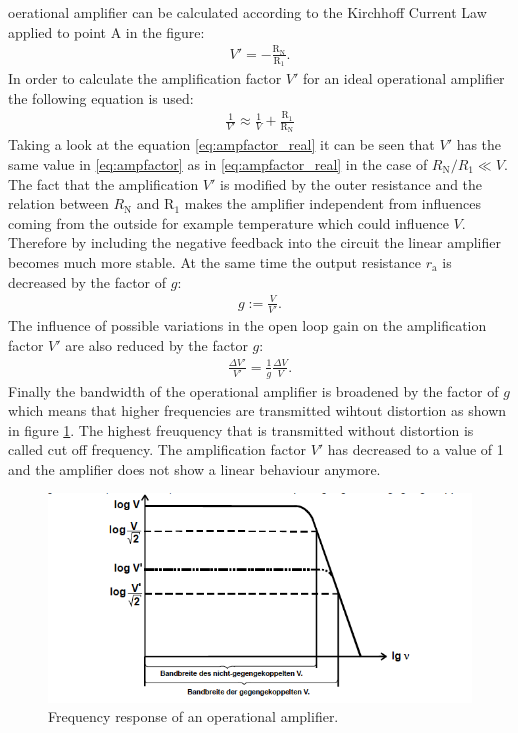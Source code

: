 oerational amplifier can be calculated according to the Kirchhoff Current Law
applied to point A in the figure:
\begin{align}
    V'=-\frac{\text{R}_{\text{N}}}{\text{R}_1}.
    \label{eq:ampfactor}
\end{align}
In order to calculate the amplification factor $V'$ for an ideal operational amplifier
the following equation is used:
\begin{align}
    \frac{1}{V'} \approx \frac{1}{V} + \frac{\text{R}_1}{\text{R}_{\text{N}}}
    \label{eq:ampfactor_real}
\end{align}
Taking a look at the equation \ref{eq:ampfactor_real} it can be seen that $V'$ has
the same value in \ref{eq:ampfactor} as in \ref{eq:ampfactor_real} in the case of
$R_{\text{N}}/R_1 \ll V$.
The fact that the amplification $V'$ is modified by the outer resistance and the
relation between $R_{\text{N}}$ and $\text{R}_1$ makes the amplifier independent from
influences coming from the outside for example temperature which could influence $V$.
Therefore by including the negative feedback into the circuit the linear amplifier becomes
much more stable.
At the same time the output resistance $r_{\text{a}}$ is decreased by the factor
of $g$:
\begin{align*}
    g:= \frac{V}{V'}.
\end{align*}
The influence of possible variations in the open loop gain on the amplification
factor $V'$ are also reduced by the factor $g$:
\begin{align*}
    \frac{\Delta V'}{V'}=\frac{1}{g}\frac{\Delta V}{V}.
\end{align*}
Finally the bandwidth of the operational amplifier is broadened by the factor of
$g$ which means that higher frequencies are transmitted wihtout distortion as shown
in figure \ref{abb4}. The highest freuquency that is transmitted without distortion
is called cut off frequency. The amplification factor $V'$ has decreased to a value of
1 and the amplifier does not show a linear behaviour anymore.
\FloatBarrier
\begin{figure}
  \centering
  \includegraphics[scale=0.5]{bandwidth.PNG}
  \caption{Frequency response of an operational amplifier. \cite{Q1}}
  \label{abb4}
\end{figure}
\FloatBarrier


